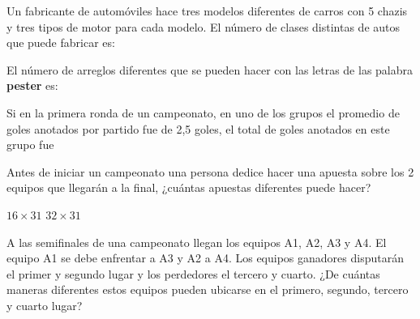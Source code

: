 \documentclass[10pt,letterpaper,addpoints]{exam}
\begin{document}
\begin{multicols}{2}
\begin{questions}
\begin{oneparchoices}
\end{oneparchoices}
\question Un fabricante de automóviles hace tres modelos diferentes de carros con 5 chazis y tres tipos de motor para cada modelo. El número de clases distintas de autos que puede fabricar es:

\begin{oneparchoices}
\end{oneparchoices}
\question El número de arreglos diferentes que se pueden hacer con las letras de las palabra \textbf{pester} es:

\begin{oneparchoices}
\end{oneparchoices}

\question \label{firstq3} Si en la primera ronda de un campeonato, en uno de los grupos el promedio de goles anotados por partido fue de 2,5 goles, el total de goles anotados en este grupo fue

\begin{oneparchoices}
\end{oneparchoices}
\question Antes de iniciar un campeonato una persona dedice hacer una apuesta sobre los 2 equipos que llegarán a la final, ¿cuántas apuestas diferentes puede hacer?

\begin{oneparchoices}
 \CorrectChoice $16\times 31$
 \choice $32\times 31$
\end{oneparchoices}
\question \label{lastq3} A las semifinales de una campeonato llegan los equipos A1, A2, A3 y A4. El equipo A1 se debe enfrentar a A3 y A2 a A4. Los equipos ganadores disputarán el primer y segundo lugar y los perdedores el tercero y cuarto. ¿De cuántas maneras diferentes estos equipos pueden ubicarse en el primero, segundo, tercero y cuarto lugar?


\end{questions}
\end{multicols}
\end{document}
